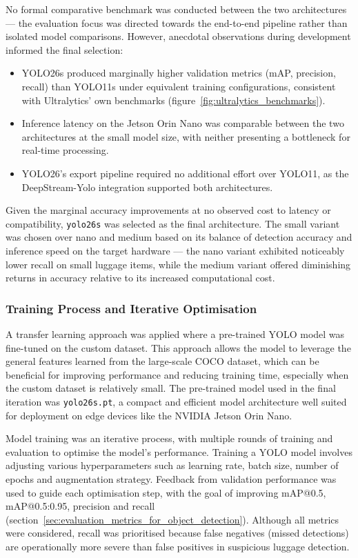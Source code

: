 No formal comparative benchmark was conducted between the two architectures ---
the evaluation focus was directed towards the end-to-end pipeline rather than
isolated model comparisons. However, anecdotal observations during development
informed the final selection:

\begin{itemize}
	\item YOLO26s produced marginally higher validation metrics (mAP, precision, recall)
	      than YOLO11s under equivalent training configurations, consistent with
	      Ultralytics' own benchmarks (figure~\ref{fig:ultralytics_benchmarks}).
	\item Inference latency on the Jetson Orin Nano was comparable between the two
	      architectures at the small model size, with neither presenting a bottleneck for
	      real-time processing.
	\item YOLO26's export pipeline required no additional effort over YOLO11, as the
	      DeepStream-Yolo integration \citep{luciano2026deepstreamyolo} supported both
	      architectures.
\end{itemize}

Given the marginal accuracy improvements at no observed cost to latency or
compatibility, \texttt{yolo26s} was selected as the final architecture. The
small variant was chosen over nano and medium based on its balance of detection
accuracy and inference speed on the target hardware --- the nano variant
exhibited noticeably lower recall on small luggage items, while the medium
variant offered diminishing returns in accuracy relative to its increased
computational cost.

\subsubsection{Training Process and Iterative Optimisation}
\label{sec:training_process}

A transfer learning approach was applied where a pre-trained YOLO model was
fine-tuned on the custom dataset. This approach allows the model to leverage
the general features learned from the large-scale COCO dataset, which can be
beneficial for improving performance and reducing training time, especially
when the custom dataset is relatively small. The pre-trained model used in the
final iteration was \texttt{yolo26s.pt}, a compact and efficient model
architecture well suited for deployment on edge devices like the NVIDIA Jetson
Orin Nano.

Model training was an iterative process, with multiple rounds of training and
evaluation to optimise the model's performance. Training a YOLO model involves
adjusting various hyperparameters such as learning rate, batch size, number of
epochs and augmentation strategy. Feedback from validation performance was used
to guide each optimisation step, with the goal of improving mAP@0.5,
mAP@0.5:0.95, precision and recall
(section~\ref{sec:evaluation_metrics_for_object_detection}). Although all
metrics were considered, recall was prioritised because false negatives (missed
detections) are operationally more severe than false positives in suspicious
luggage detection.


